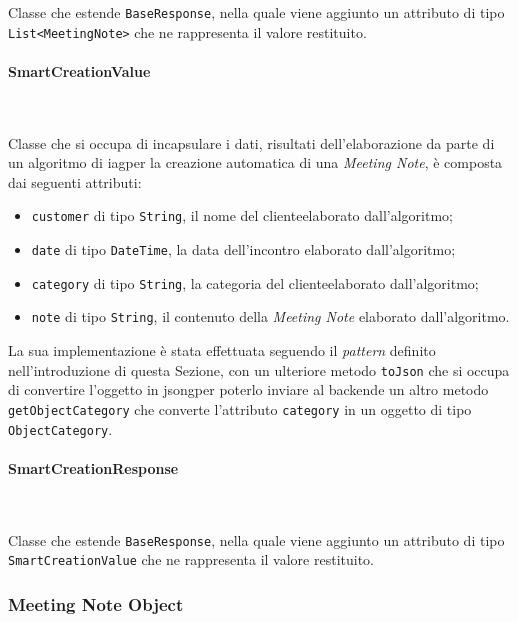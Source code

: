 \noindent Classe che estende \lstinline{BaseResponse}, nella quale viene aggiunto un attributo di tipo \lstinline{List<MeetingNote>} che ne rappresenta il valore restituito.

\paragraph*{SmartCreationValue} ~ \\
\label{par:smart-creation-value}

\noindent Classe che si occupa di incapsulare i dati, risultati dell'elaborazione da parte di un algoritmo di \gls{iag}\glsoccur per la creazione automatica di una \emph{Meeting Note}, è composta dai seguenti attributi:
\begin{itemize}
    \item \lstinline{customer} di tipo \lstinline{String}, il nome del \gls{cliente}\glsoccur elaborato dall'algoritmo;
    \item \lstinline{date} di tipo \lstinline{DateTime}, la data dell'incontro elaborato dall'algoritmo;
    \item \lstinline{category} di tipo \lstinline{String}, la categoria del \gls{cliente}\glsoccur elaborato dall'algoritmo;
    \item \lstinline{note} di tipo \lstinline{String}, il contenuto della \emph{Meeting Note} elaborato dall'algoritmo.
\end{itemize}
La sua implementazione è stata effettuata seguendo il \emph{pattern} definito nell'introduzione di questa Sezione, con un ulteriore metodo \lstinline{toJson} che si occupa di convertire l'oggetto in \gls{jsong}\glsoccur per poterlo inviare al \gls{backend}\glsoccur e un altro metodo \lstinline{getObjectCategory} che converte l'attributo \lstinline{category} in un oggetto di tipo \lstinline{ObjectCategory}.

\paragraph*{SmartCreationResponse} ~ \\
\label{par:smart-creation-response}

\noindent Classe che estende \lstinline{BaseResponse}, nella quale viene aggiunto un attributo di tipo \lstinline{SmartCreationValue} che ne rappresenta il valore restituito.

\subsubsection*{Meeting Note Object}
\label{subsubsec:meeting-note-object}

